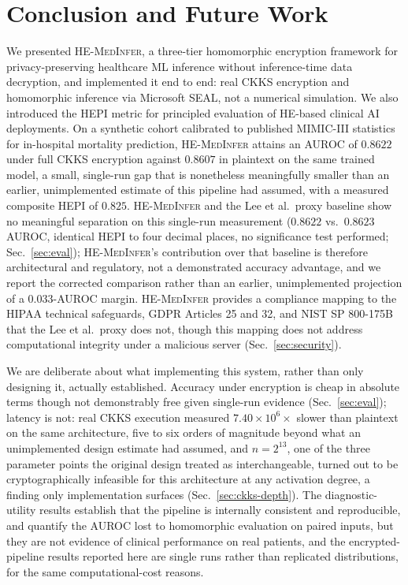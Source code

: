 \documentclass[journal,compsoc]{IEEEtran}
\newcommand{\HEPI}{\textsc{HEPI}}          %
\newcommand{\framework}{\textsc{HE-MedInfer}}
\begin{document}
\section{Conclusion and Future Work}
\label{sec:conclusion}

We presented \framework{}, a three-tier homomorphic encryption framework for
privacy-preserving healthcare ML inference without inference-time data decryption, and
implemented it end to end: real CKKS encryption and homomorphic inference via
Microsoft SEAL, not a numerical simulation. We also introduced the \HEPI{}
metric for principled evaluation of HE-based clinical AI deployments. On a
synthetic cohort calibrated to published MIMIC-III statistics for in-hospital
mortality prediction, \framework{} attains an AUROC of $0.8622$ under full CKKS
encryption against $0.8607$ in plaintext on the same trained model, a small,
single-run gap that is nonetheless meaningfully smaller than an earlier,
unimplemented estimate of this pipeline had assumed, with a measured composite
\HEPI{} of $0.825$. \framework{} and the Lee et al.\ proxy baseline show no
meaningful separation on this single-run measurement ($0.8622$ vs.\ $0.8623$
AUROC, identical \HEPI{} to four decimal places, no significance test
performed; Sec.~\ref{sec:eval}); \framework{}'s contribution
over that baseline is therefore architectural and regulatory, not a demonstrated accuracy
advantage, and we report the corrected comparison rather than an earlier,
unimplemented projection of a $0.033$-AUROC margin. \framework{} provides a
compliance mapping to the HIPAA technical safeguards, GDPR Articles 25 and
32, and NIST SP 800-175B~\cite{nist2020sp800175b} that the Lee et al.\ proxy does not, though this
mapping does not address computational integrity under a malicious server
(Sec.~\ref{sec:security}).

We are deliberate about what implementing this system, rather than only
designing it, actually established. Accuracy under encryption is cheap in
absolute terms though not demonstrably free given single-run evidence
(Sec.~\ref{sec:eval}); latency is not: real CKKS execution measured $7.40 \times
10^6\times$ slower than plaintext on the same architecture, five to six orders of
magnitude beyond what an unimplemented design estimate had assumed, and
$n=2^{13}$, one of the three parameter points the original design treated as
interchangeable, turned out to be cryptographically infeasible for this
architecture at any activation degree, a finding only implementation
surfaces (Sec.~\ref{sec:ckks-depth}). The diagnostic-utility results establish
that the pipeline is internally consistent and reproducible, and quantify the
AUROC lost to homomorphic evaluation on paired inputs, but they are not
evidence of clinical performance on real patients, and the encrypted-pipeline
results reported here are single runs rather than replicated distributions,
for the same computational-cost reasons.
\end{document}
